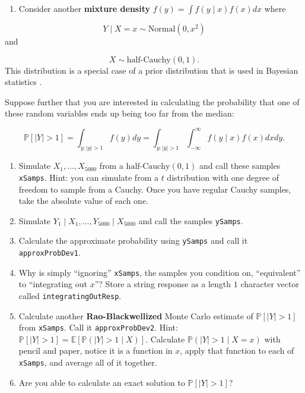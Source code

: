 \documentclass[
  12pt,
  krantz2]{krantz}
\providecommand{\tightlist}{%
  \setlength{\itemsep}{0pt}\setlength{\parskip}{0pt}}
\begin{document}
\begin{enumerate}
\def\labelenumi{\arabic{enumi}.}
\setcounter{enumi}{2}
\tightlist
\item
  Consider another \textbf{mixture density} \(f(y) = \int f(y \mid x) f(x) dx\) where
\end{enumerate}

\[
Y \mid X = x \sim \text{Normal}(0, x^2)
\]
and

\[
X \sim \text{half-Cauchy}(0, 1).
\]
This distribution is a special case of a prior distribution that is used in Bayesian statistics \citep{horseshoe}.

Suppose further that you are interested in calculating the probability that one of these random variables ends up being too far from the median:

\[
\mathbb{P}[|Y| > 1] = \int_{y : |y| > 1} f(y)dy = \int_{y : |y| > 1} \int_{-\infty}^\infty  f(y \mid x) f(x) dx dy.
\]

\begin{enumerate}
\def\labelenumi{\alph{enumi}.}
\item
  Simulate \(X_1, \ldots, X_{5000}\) from a \(\text{half-Cauchy}(0, 1)\) and call these samples \texttt{xSamps}. Hint: you can simulate from a \(t\) distribution with one degree of freedom to sample from a Cauchy. Once you have regular Cauchy samples, take the absolute value of each one.
\item
  Simulate \(Y_1 \mid X_1, \ldots, Y_{5000} \mid X_{5000}\) and call the samples \texttt{ySamps}.
\item
  Calculate the approximate probability using \texttt{ySamps} and call it \texttt{approxProbDev1}.
\item
  Why is simply ``ignoring'' \texttt{xSamps}, the samples you condition on, ``equivalent'' to ``integrating out \(x\)''? Store a string response as a length \(1\) character vector called \texttt{integratingOutResp}.
\item
  Calculate another \textbf{Rao-Blackwellized} Monte Carlo estimate of \(\mathbb{P}[|Y| > 1]\) from \texttt{xSamps}. Call it \texttt{approxProbDev2}. Hint: \(\mathbb{P}[|Y| > 1] = \mathbb{E}[\mathbb{P}(|Y| > 1 \mid X) ]\). Calculate \(\mathbb{P}(|Y| > 1 \mid X=x)\) with pencil and paper, notice it is a function in \(x\), apply that function to each of \texttt{xSamps}, and average all of it together.
\item
  Are you able to calculate an exact solution to \(\mathbb{P}[|Y| > 1]\)?
\end{enumerate}
\end{document}
